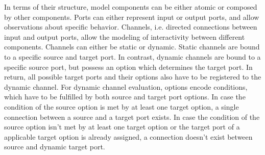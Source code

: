 In terms of their structure, model components can be either atomic or composed by other components. Ports can either represent input or output ports, and allow observations about specific behavior. Channels, i.e. directed connections between input and output ports, allow the modeling of interactivity between different components. Channels can either be static or dynamic. Static channels are bound to a specific source and target port. In contrast, dynamic channels are bound to a specific source port, but possess an option which determines the target port. In return, all possible target ports and their options also have to be registered to the dynamic channel. For dynamic channel evaluation, options encode conditions, which have to be fulfilled by both source and target port options. In case the condition of the source option is met by at least one target option, a single connection between a source and a target port exists. In case the condition of the source option isn't met by at least one target option or the target port of a applicable target option is already assigned, a connection doesn't exist between source and dynamic target port.